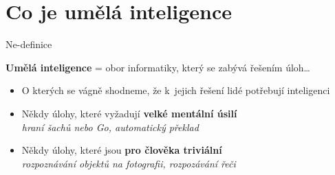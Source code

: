 \documentclass[aspectratio=169,dvipsnames]{beamer}
\begin{document}

\section[Co je AI]{Co je umělá inteligence}


\begin{frame}{Ne-definice}

    \begin{center}
        \Large
    \textbf{Umělá inteligence} = obor informatiky, který se zabývá řešením
    úloh\ldots
    \end{center}

    \vspace{10pt}

    \begin{itemize}

        \item<2-> O kterých se vágně shodneme, že k~jejich řešení lidé potřebují
            inteligenci

        \item<3-> Někdy úlohy, které vyžadují \textbf{velké mentální úsilí} \\
            \quad \emph{hraní šachů nebo Go, automatický překlad}

        \item<4-> Někdy úlohy, které jsou \textbf{pro člověka triviální} \\
            \quad \emph{rozpoznávání objektů na fotografii, rozpozávání řeči}

    \end{itemize}

    \centering\vspace{15pt}


\end{frame}

\end{document}
